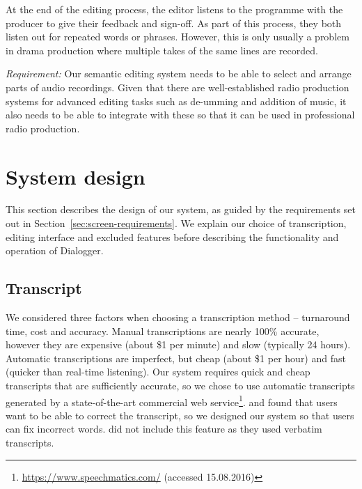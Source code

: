 At the end of the editing process, the editor listens to the programme with the
producer to give their feedback and sign-off. As part of this process, they both listen out for repeated words or
phrases. However, this is only usually a problem in drama production where multiple takes of the same lines are
recorded.

\textit{Requirement:} Our semantic editing system needs to be able to select and arrange parts of audio recordings.
Given that there are well-established radio production systems for advanced editing tasks such as de-umming and
addition of music, it also needs to be able to integrate with these so that it can be used in professional radio
production.


%
%
%
%
%
%

\section{System design}\label{sec:screen-design}
This section describes the design of our system, as guided by the requirements set out in
Section~\ref{sec:screen-requirements}. We explain our choice of transcription, editing interface and excluded features
before describing the functionality and operation of Dialogger.

\subsection{Transcript}
We considered three factors when choosing a transcription method -- turnaround time, cost and accuracy. Manual
transcriptions are nearly 100\% accurate, however they are expensive (about \$1 per minute) and slow (typically 24
hours). Automatic transcriptions are imperfect, but cheap (about \$1 per hour) and fast (quicker than real-time
listening). Our system requires quick and cheap transcripts that are sufficiently accurate, so we chose to use automatic
transcripts generated by a state-of-the-art commercial web service\footnote{\url{https://www.speechmatics.com/}
  (accessed 15.08.2016)}.
\citet{Whittaker2004} and \citet{Sivaraman2016} found that users want to be able to correct the transcript, so we
designed our system so that users can fix incorrect words.
\citet{Rubin2013} did not include this feature as they used verbatim transcripts.

